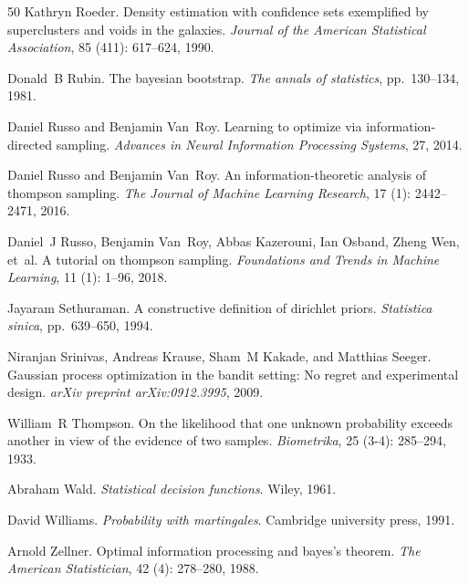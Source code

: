 \documentclass[10pt]{article}
\begin{document}
\begin{thebibliography}{50}
Kathryn Roeder.
\newblock Density estimation with confidence sets exemplified by superclusters and voids in the galaxies.
\newblock \emph{Journal of the American Statistical Association}, 85 (411): 617--624, 1990.

Donald~B Rubin.
\newblock The bayesian bootstrap.
\newblock \emph{The annals of statistics}, pp.\  130--134, 1981.

Daniel Russo and Benjamin Van~Roy.
\newblock Learning to optimize via information-directed sampling.
\newblock \emph{Advances in Neural Information Processing Systems}, 27, 2014.

Daniel Russo and Benjamin Van~Roy.
\newblock An information-theoretic analysis of thompson sampling.
\newblock \emph{The Journal of Machine Learning Research}, 17 (1): 2442--2471, 2016.

Daniel~J Russo, Benjamin Van~Roy, Abbas Kazerouni, Ian Osband, Zheng Wen, et~al.
\newblock A tutorial on thompson sampling.
\newblock \emph{Foundations and Trends{\textregistered} in Machine Learning}, 11 (1): 1--96, 2018.

Jayaram Sethuraman.
\newblock A constructive definition of dirichlet priors.
\newblock \emph{Statistica sinica}, pp.\  639--650, 1994.

Niranjan Srinivas, Andreas Krause, Sham~M Kakade, and Matthias Seeger.
\newblock Gaussian process optimization in the bandit setting: No regret and experimental design.
\newblock \emph{arXiv preprint arXiv:0912.3995}, 2009.

William~R Thompson.
\newblock On the likelihood that one unknown probability exceeds another in view of the evidence of two samples.
\newblock \emph{Biometrika}, 25 (3-4): 285--294, 1933.

Abraham Wald.
\newblock \emph{Statistical decision functions}.
\newblock Wiley, 1961.

David Williams.
\newblock \emph{Probability with martingales}.
\newblock Cambridge university press, 1991.

Arnold Zellner.
\newblock Optimal information processing and bayes's theorem.
\newblock \emph{The American Statistician}, 42 (4): 278--280, 1988.

\end{thebibliography}
\end{document}
